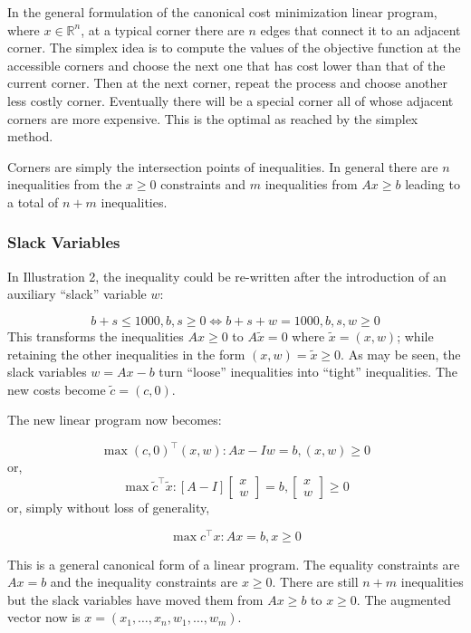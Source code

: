 \documentclass[11pt,]{article}
\begin{document}
In the general formulation of the canonical cost minimization linear
program, where \(x\in \mathbb{R}^n\), at a typical corner there are
\(n\) edges that connect it to an adjacent corner. The simplex idea is
to compute the values of the objective function at the accessible
corners and choose the next one that has cost lower than that of the
current corner. Then at the next corner, repeat the process and choose
another less costly corner. Eventually there will be a special corner
all of whose adjacent corners are more expensive. This is the optimal as
reached by the simplex method.

Corners are simply the intersection points of inequalities. In general
there are \(n\) inequalities from the \(x \geq 0\) constraints and \(m\)
inequalities from \(Ax\geq b\) leading to a total of \(n+m\)
inequalities.

\subsubsection{Slack Variables}\label{slack-variables}

In Illustration 2, the inequality could be re-written after the
introduction of an auxiliary ``slack'' variable \(w\):

\[
b+s\leq 1000, b, s\geq 0 \iff b+s+w = 1000, b, s, w\geq 0
\] This transforms the inequalities \(Ax\geq 0\) to \(A\tilde{x} = 0\)
where \(\tilde{x} = (x, w)\); while retaining the other inequalities in
the form \((x, w) = \tilde{x}\geq 0\). As may be seen, the slack
variables \(w = Ax-b\) turn ``loose'' inequalities into ``tight''
inequalities. The new costs become \(\tilde{c} = (c, 0)\).

The new linear program now becomes:

\[
\max  (c, 0)^{\top}(x,w): Ax - Iw = b, (x, w) \geq 0 
\] or, \[
\max \tilde{c}^{\top}\tilde{x}: [A -I]\begin{bmatrix}x\\w\end{bmatrix} = b, 
\begin{bmatrix}x\\w\end{bmatrix} \geq 0
\] or, simply without loss of generality,

\[
\max c^{\top}x: Ax = b, x \geq 0
\]

This is a general canonical form of a linear program. The equality
constraints are \(Ax=b\) and the inequality constraints are \(x\geq 0\).
There are still \(n+m\) inequalities but the slack variables have moved
them from \(Ax\geq b\) to \(x\geq 0\). The augmented vector now is
\(x = (x_1,\hdots, x_n, w_1, \hdots, w_m)\).
\end{document}
